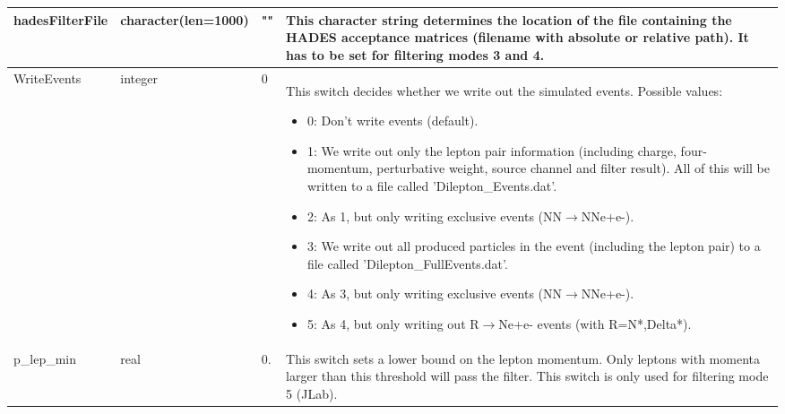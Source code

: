 \documentclass{article}
\begin{document}
\begin{longtable}{llll}
\midrule
hadesFilterFile & \begin{minipage}[t]{2cm}character(len=1000)\end{minipage} & \begin{minipage}[t]{2cm}""\end{minipage} & \begin{minipage}[t]{12cm}This character string determines the location of the file containing the HADES acceptance matrices (filename with absolute or relative path). It has to be set for filtering modes 3 and 4.\end{minipage}\\*
\midrule
WriteEvents & \begin{minipage}[t]{2cm}integer\end{minipage} & \begin{minipage}[t]{2cm}0\end{minipage} & \begin{minipage}[t]{12cm}This switch decides whether we write out the simulated events. Possible values:\begin{itemize}\leftmargin0em\itemindent0pt\item 0: Don't write events (default).\item 1: We write out only the lepton pair information (including charge,   four-momentum, perturbative weight, source channel and filter result).   All of this will be written to a file called 'Dilepton\_Events.dat'.\item 2: As 1, but only writing exclusive events (NN$\rightarrow$NNe+e-).\item 3: We write out all produced particles in the event   (including the lepton pair) to a file called 'Dilepton\_FullEvents.dat'.\item 4: As 3, but only writing exclusive events (NN$\rightarrow$NNe+e-).\item 5: As 4, but only writing out R$\rightarrow$Ne+e- events (with R=N*,Delta*).\end{itemize}\end{minipage}\\*
\midrule
p\_lep\_min & \begin{minipage}[t]{2cm}real\end{minipage} & \begin{minipage}[t]{2cm}0.\end{minipage} & \begin{minipage}[t]{12cm}This switch sets a lower bound on the lepton momentum. Only leptons with momenta larger than this threshold will pass the filter. This switch is only used for filtering mode 5 (JLab).\end{minipage}\\*

\end{longtable}
\end{document}
